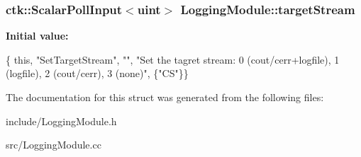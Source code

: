 \subsubsection[{\texorpdfstring{target\+Stream}{targetStream}}]{\setlength{\rightskip}{0pt plus 5cm}ctk\+::\+Scalar\+Poll\+Input$<$uint$>$ Logging\+Module\+::target\+Stream}\hypertarget{structLoggingModule_a514d6e2c4e43b577c71e25c09be6b6d0}{}\label{structLoggingModule_a514d6e2c4e43b577c71e25c09be6b6d0}
{\bfseries Initial value\+:}
\begin{DoxyCode}
\{ \textcolor{keyword}{this}, \textcolor{stringliteral}{"SetTargetStream"}, \textcolor{stringliteral}{""},
          \textcolor{stringliteral}{"Set the tagret stream: 0 (cout/cerr+logfile), 1 (logfile), 2 (cout/cerr), 3 (none)"},
  \{\textcolor{stringliteral}{"CS"}\}\}
\end{DoxyCode}


The documentation for this struct was generated from the following files\+:\begin{DoxyCompactItemize}
\item 
include/Logging\+Module.\+h\item 
src/Logging\+Module.\+cc\end{DoxyCompactItemize}
